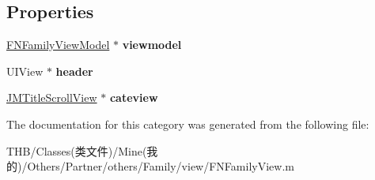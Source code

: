 \subsection*{Properties}
\begin{DoxyCompactItemize}
\item 
\mbox{\label{category_f_n_family_view_07_08_afd5c61ea8e6e0b863582b9d87a388d24}} 
\mbox{\hyperlink{interface_f_n_family_view_model}{F\+N\+Family\+View\+Model}} $\ast$ {\bfseries viewmodel}
\item 
\mbox{\label{category_f_n_family_view_07_08_a261a5824462f4b07e71f76fa40380a9e}} 
U\+I\+View $\ast$ {\bfseries header}
\item 
\mbox{\label{category_f_n_family_view_07_08_a16a82b2db36d4a4d808933cef6de1664}} 
\mbox{\hyperlink{interface_j_m_title_scroll_view}{J\+M\+Title\+Scroll\+View}} $\ast$ {\bfseries cateview}
\end{DoxyCompactItemize}


The documentation for this category was generated from the following file\+:\begin{DoxyCompactItemize}
\item 
T\+H\+B/\+Classes(类文件)/\+Mine(我的)/\+Others/\+Partner/others/\+Family/view/F\+N\+Family\+View.\+m\end{DoxyCompactItemize}
